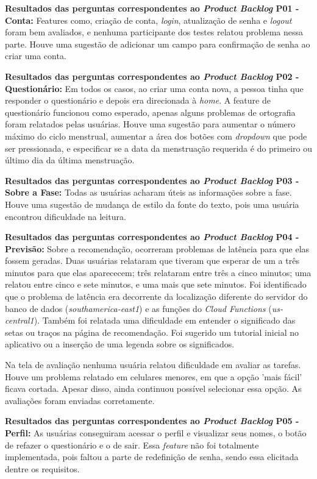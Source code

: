 \textbf{Resultados das perguntas correspondentes ao \emph{Product Backlog} P01 - Conta:} Features como, criação de conta, \emph{login}, atualização de 
senha e \emph{logout} foram bem avaliados, e nenhuma participante dos testes relatou problema nessa parte. 
Houve uma sugestão de adicionar um campo para confirmação de senha ao criar uma conta.


\textbf{Resultados das perguntas correspondentes ao \emph{Product Backlog} P02 - Questionário:} Em todos os casos, ao criar uma 
conta nova, a pessoa tinha que responder o 
questionário e depois era direcionada à \emph{home}. A feature de questionário 
funcionou como esperado, apenas alguns problemas de ortografia foram relatados pelas usuárias. Houve uma sugestão para aumentar o 
número máximo do ciclo menstrual, aumentar a área dos botões com \emph{dropdown} que pode ser pressionada, e especificar se a 
data da menstruação requerida é do 
primeiro ou último dia da última menstruação.

\textbf{Resultados das perguntas correspondentes ao \emph{Product Backlog} P03 - Sobre a Fase:} Todas as usuárias acharam úteis 
as informações 
sobre a fase. Houve uma sugestão de mudança de estilo da fonte do texto, pois uma usuária encontrou dificuldade na leitura.


\textbf{Resultados das perguntas correspondentes ao \emph{Product Backlog} P04 - Previsão:} Sobre a recomendação, ocorreram 
problemas de latência para que elas fossem geradas. Duas usuárias relataram que tiveram que esperar de um a três 
minutos para que elas aparececem; três relataram entre três a cinco minutos; uma relatou entre cinco e sete minutos, 
e uma mais que sete minutos. Foi identificado que o problema de latência era 
decorrente da localização diferente do servidor do banco de dados (\emph{southamerica-east1}) e as 
funções do \emph{Cloud Functions} (\emph{us-central1}). Também foi relatada 
uma dificuldade em entender o significado das setas ou traços na página de recomendação. Foi sugerido 
um tutorial inicial no aplicativo ou a inserção de uma legenda sobre os significados.

Na tela de avaliação nenhuma usuária relatou dificuldade em avaliar as tarefas. Houve um problema relatado 
em celulares menores, em que a opção 'mais fácil' ficava cortada. Apesar disso, ainda continuou possível selecionar 
essa opção. As avaliações foram enviadas corretamente.

\textbf{Resultados das perguntas correspondentes ao \emph{Product Backlog} P05 - Perfil:} As usuárias conseguiram acessar o perfil 
e visualizar seus nomes, o botão de refazer o questionário e o de sair. Essa \emph{feature} não foi totalmente implementada, pois faltou a 
parte de redefinição de senha, sendo essa elicitada dentre os requisitos.

